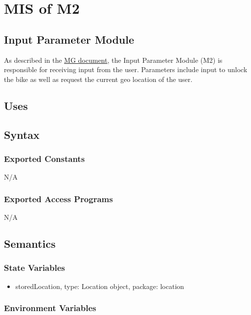 \section{MIS of M2} \label{InputParameters} 

\subsection{Input Parameter Module}

As described in the \href{https://github.com/NevoAbigail/Capstone/blob/main/docs/Design/SoftArchitecture/MG.pdf}{MG document}, the Input Parameter Module (M2) is responsible for receiving input from the user. Parameters include input to unlock the bike as well as request the current geo location of the user. 

\subsection{Uses}


\subsection{Syntax}

\subsubsection{Exported Constants}

N/A

\subsubsection{Exported Access Programs}

N/A

\subsection{Semantics}

\subsubsection{State Variables}

\begin{itemize}
\item storedLocation, type: Location object, package: location
\end{itemize}


\subsubsection{Environment Variables}


